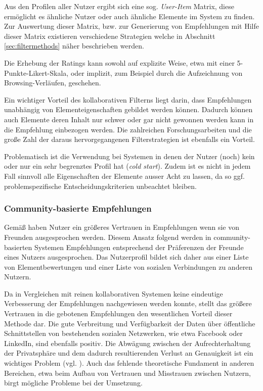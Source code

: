Aus den Profilen aller Nutzer ergibt sich eine sog. \textit{User-Item} Matrix, diese ermöglicht es ähnliche Nutzer oder auch ähnliche Elemente im System zu finden. Zur Auswertung dieser Matrix, bzw. zur Generierung von Empfehlungen mit Hilfe dieser Matrix existieren verschiedene Strategien welche in Abschnitt \ref{sec:filtermethods} näher beschrieben werden.

Die Erhebung der Ratings kann sowohl auf explizite Weise, etwa mit einer 5-Punkte-Likert-Skala, oder implizit, zum Beispiel durch die Aufzeichnung von Browsing-Verläufen, geschehen.

Ein wichtiger Vorteil des kollaborativen Filterns liegt darin, dass Empfehlungen unabhängig von Elementeigenschaften gebildet werden können. Dadurch können auch Elemente deren Inhalt nur schwer oder gar nicht gewonnen werden kann in die Empfehlung einbezogen werden. Die zahlreichen Forschungsarbeiten und die große Zahl der daraus hervorgegangenen Filterstrategien ist ebenfalls ein Vorteil.

Problematisch ist die Verwendung bei Systemen in denen der Nutzer (noch) kein oder nur ein sehr begrenztes Profil hat (\textit{cold start}). Zudem ist es nicht in jedem Fall sinnvoll alle Eigenschaften der Elemente ausser Acht zu lassen, da so ggf. problemspezifische Entscheidungskriterien unbeachtet bleiben.  \citep{hb,Burke:2002:HRS:586321.586352} %

\subsubsection{Community-basierte Empfehlungen}
Gemäß \citep{SinhaS01} haben Nutzer ein größeres Vertrauen in Empfehlungen wenn sie von Freunden ausgesprochen werden. Diesem Ansatz folgend werden in community-basierten Systemen Empfehlungen entsprechend der Präferenzen der Freunde eines Nutzers ausgesprochen. Das Nutzerprofil bildet sich daher aus einer Liste von Elementbewertungen und einer Liste von sozialen Verbindungen zu anderen Nutzern.

Da in Vergleichen mit reinen kollaborativen Systemen keine eindeutige Verbesserung der Empfehlungen nachgewiesen werden konnte, stellt das größere Vertrauen in die gebotenen Empfehlungen den wesentlichen Vorteil dieser Methode dar. Die gute Verbreitung und Verfügbarkeit der Daten über öffentliche Schnittstellen von  bestehenden sozialen Netzwerken, wie etwa Facebook oder LinkedIn, sind ebenfalls positiv. Die Abwägung zwischen der Aufrechterhaltung der Privatsphäre und dem dadurch resultierenden Verlust an Genauigkeit ist ein wichtiges Problem (vgl. \citep{machanavajjhala:accurate}). Auch das fehlende theoretische Fundament in anderen Bereichen, etwa beim Aufbau von Vertrauen und Misstrauen zwischen Nutzern, birgt mögliche Probleme bei der Umsetzung. \citep{hb_20}

